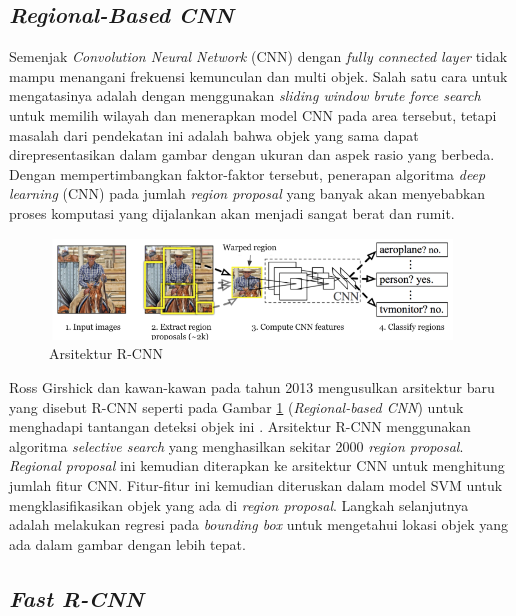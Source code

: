 \subsection{\textit{Regional-Based CNN}}
\label{subsec:rcnn}

Semenjak\textit{ Convolution Neural Network} (CNN) dengan \textit{fully connected layer} tidak mampu menangani frekuensi kemunculan dan multi objek. Salah satu cara untuk mengatasinya adalah dengan menggunakan \textit{sliding window brute force search} untuk memilih wilayah dan menerapkan model CNN pada area tersebut, tetapi masalah dari pendekatan ini adalah bahwa objek yang sama dapat direpresentasikan dalam gambar dengan ukuran dan aspek rasio yang berbeda. Dengan mempertimbangkan faktor-faktor tersebut, penerapan algoritma \textit{deep learning} (CNN) pada jumlah \textit{region proposal} yang banyak akan menyebabkan proses komputasi yang dijalankan akan menjadi sangat berat dan rumit.

\begin{figure}[h!]
	\centering
	\includegraphics[scale=0.3]{gambar/rcnn.png}
	\caption{Arsitektur R-CNN \citep{arch-rcnn}}
	\label{fig:rcnn}
\end{figure}

Ross Girshick dan kawan-kawan pada tahun 2013 mengusulkan arsitektur baru yang disebut R-CNN seperti pada Gambar \ref{fig:rcnn} (\textit{Regional-based CNN}) untuk menghadapi tantangan deteksi objek ini \citep{rcnn}. Arsitektur R-CNN menggunakan algoritma \textit{selective search} yang menghasilkan sekitar 2000 \textit{region proposal}. \textit{Regional proposal} ini kemudian diterapkan ke arsitektur CNN untuk menghitung jumlah fitur CNN. Fitur-fitur ini kemudian diteruskan dalam model SVM untuk mengklasifikasikan objek yang ada di \textit{region proposal}. Langkah selanjutnya adalah melakukan regresi pada \textit{bounding box} untuk mengetahui lokasi objek yang ada dalam gambar dengan lebih tepat.

\subsection{\textit{Fast R-CNN}}
\label{subsec:fast-rcnn}

